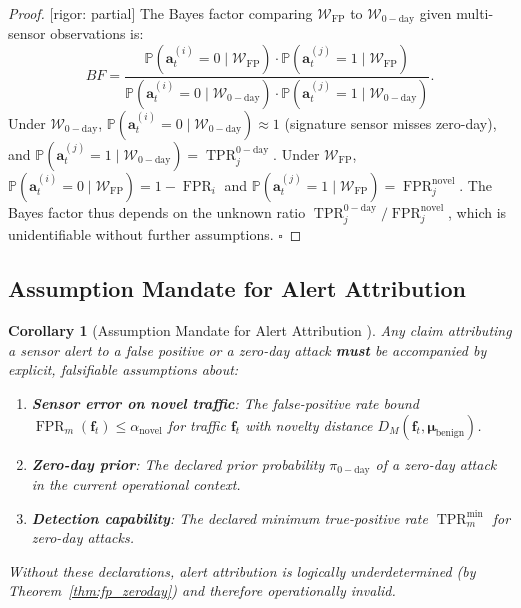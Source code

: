 \documentclass[11pt,a4paper]{article}
\newtheorem{corollary}[theorem]{Corollary}
\theoremstyle{definition}
\theoremstyle{remark}
\newcommand{\rigorPartial}{\textcolor{orange!80!black}{[rigor: partial]}}
\DeclareMathOperator{\TPR}{TPR}
\DeclareMathOperator{\FPR}{FPR}
\newcommand{\Pbb}{\mathbb{P}}
\newcommand{\FP}{\mathrm{FP}}
\newcommand{\zeroday}{\mathrm{0-day}}
\newcommand{\alertvec}{\mathbf{a}}
\newcommand{\flowvec}{\mathbf{f}}
\begin{document}
\begin{proof}\rigorPartial
The Bayes factor comparing $\mathcal{W}_{\FP}$ to $\mathcal{W}_{\zeroday}$ given multi-sensor observations is:
\begin{equation}
BF = \frac{\Pbb(\alertvec_t^{(i)} = 0 \mid \mathcal{W}_{\FP}) \cdot \Pbb(\alertvec_t^{(j)} = 1 \mid \mathcal{W}_{\FP})}{\Pbb(\alertvec_t^{(i)} = 0 \mid \mathcal{W}_{\zeroday}) \cdot \Pbb(\alertvec_t^{(j)} = 1 \mid \mathcal{W}_{\zeroday})}.
\label{eq:bayes_factor}
\end{equation}
Under $\mathcal{W}_{\zeroday}$, $\Pbb(\alertvec_t^{(i)} = 0 \mid \mathcal{W}_{\zeroday}) \approx 1$ (signature sensor misses zero-day), and $\Pbb(\alertvec_t^{(j)} = 1 \mid \mathcal{W}_{\zeroday}) = \TPR_j^{\zeroday}$. Under $\mathcal{W}_{\FP}$, $\Pbb(\alertvec_t^{(i)} = 0 \mid \mathcal{W}_{\FP}) = 1 - \FPR_i$ and $\Pbb(\alertvec_t^{(j)} = 1 \mid \mathcal{W}_{\FP}) = \FPR_j^{\mathrm{novel}}$. The Bayes factor thus depends on the unknown ratio $\TPR_j^{\zeroday} / \FPR_j^{\mathrm{novel}}$, which is unidentifiable without further assumptions. $\square$
\end{proof}

\subsection{Assumption Mandate for Alert Attribution }

\begin{corollary}[Assumption Mandate for Alert Attribution ]
\label{cor:assumption_mandate}
Any claim attributing a sensor alert to a false positive or a zero-day attack \textbf{must} be accompanied by explicit, falsifiable assumptions about:
\begin{enumerate}[label=(\roman*)]
    \item \textbf{Sensor error on novel traffic}: The false-positive rate bound $\FPR_m(\flowvec_t) \leq \alpha_{\mathrm{novel}}$ for traffic $\flowvec_t$ with novelty distance $D_M(\flowvec_t, \boldsymbol{\mu}_{\mathrm{benign}})$.
    \item \textbf{Zero-day prior}: The declared prior probability $\pi_{\zeroday}$ of a zero-day attack in the current operational context.
    \item \textbf{Detection capability}: The declared minimum true-positive rate $\TPR_m^{\min}$ for zero-day attacks.
\end{enumerate}
Without these declarations, alert attribution is logically underdetermined (by Theorem~\ref{thm:fp_zeroday}) and therefore operationally invalid.
\end{corollary}
\end{document}
